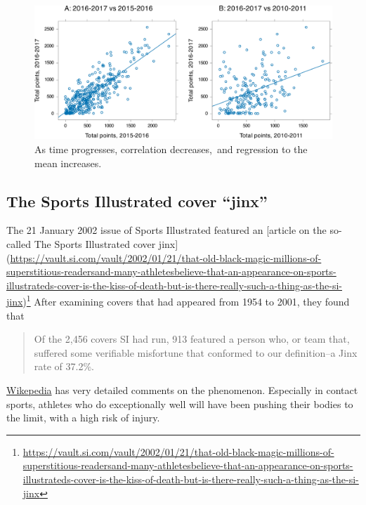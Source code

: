 \documentclass[
  10pt,
  b5paper]{book}
\begin{document}
\begin{figure}[H]

{\centering \includegraphics[width=1\linewidth]{07-regress_files/figure-latex/NBA-1} 

}

\caption{As time progresses, correlation decreases, and regression to the mean increases.}\label{fig:NBA}
\end{figure}

\hypertarget{the-sports-illustrated-cover-jinx}{%
\subsection*{The Sports Illustrated cover ``jinx''}\label{the-sports-illustrated-cover-jinx}}

The 21 January 2002 issue of Sports Illustrated featured an
{[}article on the so-called The Sports Illustrated cover jinx{]}
(\url{https://vault.si.com/vault/2002/01/21/that-old-black-magic-millions-of-superstitious-readersand-many-athletesbelieve-that-an-appearance-on-sports-illustrateds-cover-is-the-kiss-of-death-but-is-there-really-such-a-thing-as-the-si-jinx})\footnote{\url{https://vault.si.com/vault/2002/01/21/that-old-black-magic-millions-of-superstitious-readersand-many-athletesbelieve-that-an-appearance-on-sports-illustrateds-cover-is-the-kiss-of-death-but-is-there-really-such-a-thing-as-the-si-jinx}}
After examining covers that had appeared from 1954 to 2001, they found that

\begin{quote}
Of the 2,456 covers SI had run, 913 featured a person who, or team that,
suffered some verifiable misfortune that conformed to our definition--a Jinx
rate of 37.2\%.
\end{quote}

\href{https://en.wikipedia.org/wiki/Sports_Illustrated_cover_jinx}{Wikepedia}
has very detailed comments on the phenomenon. Especially in contact sports,
athletes who do exceptionally well will have been pushing their bodies to the
limit, with a high risk of injury.
\end{document}
